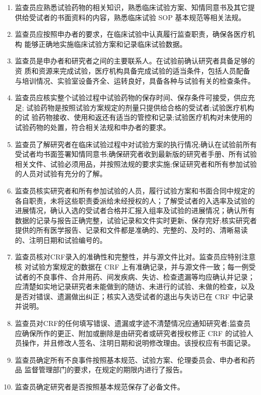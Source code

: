 \documentclass[
  chinese-hans,
  letterpaper,
  DIV=11,
  numbers=noendperiod]{scrreprt}
\begin{document}
\begin{enumerate}
\def\labelenumi{\arabic{enumi}.}
\item
  监查员应熟悉试验药物的相关知识，熟悉临床试验方案、知情同意书及其它提供给受试者的书面资料的内容，熟悉临床试验
  SOP 基本规范等相关法规。
\item
  监查员应按照申办者的要求，在临床试验中认真履行监查职责，确保各医疗机构
  能够正确地实施临床试验方案和记录临床试验数据。
\item
  监查员是申办者和研究者之间的主要联系人。在试验前确认研究者具备足够的资
  质和资源来完成试验，医疗机构具备完成试验的适当条件，包括人员配备与培训情况、实验室设备齐全、运转良好，具备各种与试验有关的检查条件。
\item
  监查员应核实整个试验过程中试验药物的保存时间、保存条件可接受，供应充足;
  试验药物是按照试验方案规定的剂量只提供给合格的受试者;试验医疗机构的试
  验药物接收、使用和返还有适当的管控和记录;试验医疗机构对未使用的试验药物的处置，符合相关法规和申办者的要求。
\item
  监查员了解研究者在临床试验过程中对试验方案的执行情况;确认在试验前所有受试者均书面签署知情同意书;确保研究者收到最新版的研究者手册、所有试验相关文件、试验必须用品，并按照法规的要求实施;保证研究者和所有参加试验的人员对试验有充分的了解。
\item
  监查员核实研究者和所有参加试验的人员，履行试验方案和书面合同中规定的各自职责，未将这些职责委派给未经授权的人；了解受试者的入选率及试验的进展情况，确认入选的受试者合格并汇报入组率及试验的进展情况；确认所有数据的记录与报告正确完整，试验记录和文件实时更新、保存完好;核实研究者提供的所有医学报告、记录和文件都是准确的、完整的、及时的、清晰易读的、注明日期和试验编号的。
\item
  监查员核对CRF录入的准确性和完整性，并与源文件比对。监查员应特别注意核
  对试验方案规定的数据在 CRF
  上有准确记录，并与源文件一致；每一例受试者的不良事件、合并用药、间发疾病、失访、检查遗漏等均应确认并记录；应清楚如实地记录研究者未能做到的随访、未进行的试验、未做的检查，以及是否对错误、遗漏做出纠正；核实入选受试者的退出与失访已在
  CRF 中记录并说明。
\item
  监查员对CRF的任何填写错误、遗漏或字迹不清楚情况应通知研究者;监查员应确保所作的更正、附加或删除是由研究者或研究者授权修正
  CRF
  的试验人员操作，并且修改人签名、注明日期和说明修改理由。该授权应有书面记录。
\item
  监查员确定所有不良事件按照基本规范、试验方案、伦理委员会、申办者和药品
  监督管理部门的要求，在规定的期限内进行了报告。
\item
  监查员确定研究者是否按照基本规范保存了必备文件。

\end{enumerate}
\end{document}
